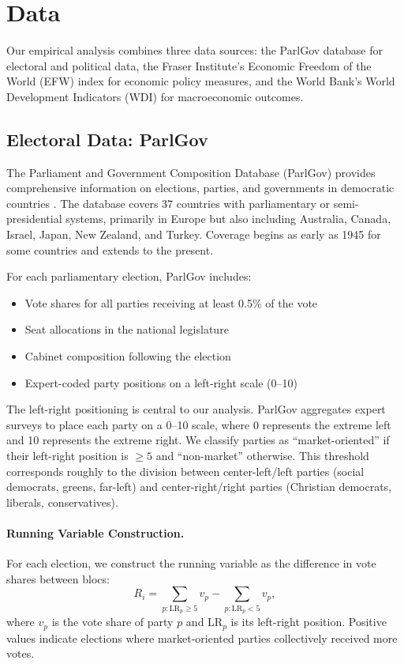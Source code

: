 \documentclass[12pt,a4paper]{article}
\begin{document}
\section{Data}
\label{sec:data}

Our empirical analysis combines three data sources: the ParlGov database 
for electoral and political data, the Fraser Institute's Economic Freedom 
of the World (EFW) index for economic policy measures, and the World Bank's 
World Development Indicators (WDI) for macroeconomic outcomes.

\subsection{Electoral Data: ParlGov}

The Parliament and Government Composition Database (ParlGov) provides 
comprehensive information on elections, parties, and governments in 
democratic countries \citep{doring2021parlgov}. The database covers 
37 countries with parliamentary or semi-presidential systems, primarily 
in Europe but also including Australia, Canada, Israel, Japan, New Zealand, 
and Turkey. Coverage begins as early as 1945 for some countries and extends 
to the present.

For each parliamentary election, ParlGov includes:
\begin{itemize}[noitemsep]
    \item Vote shares for all parties receiving at least 0.5\% of the vote
    \item Seat allocations in the national legislature
    \item Cabinet composition following the election
    \item Expert-coded party positions on a left-right scale (0--10)
\end{itemize}

The left-right positioning is central to our analysis. ParlGov aggregates 
expert surveys to place each party on a 0--10 scale, where 0 represents 
the extreme left and 10 represents the extreme right. We classify parties 
as ``market-oriented'' if their left-right position is $\geq 5$ and 
``non-market'' otherwise. This threshold corresponds roughly to the 
division between center-left/left parties (social democrats, greens, 
far-left) and center-right/right parties (Christian democrats, liberals, 
conservatives).

\paragraph{Running Variable Construction.}
For each election, we construct the running variable as the difference 
in vote shares between blocs:
\begin{equation}
    R_i = \sum_{p: \text{LR}_p \geq 5} v_p - \sum_{p: \text{LR}_p < 5} v_p,
\end{equation}
where $v_p$ is the vote share of party $p$ and $\text{LR}_p$ is its 
left-right position. Positive values indicate elections where 
market-oriented parties collectively received more votes.
\end{document}
